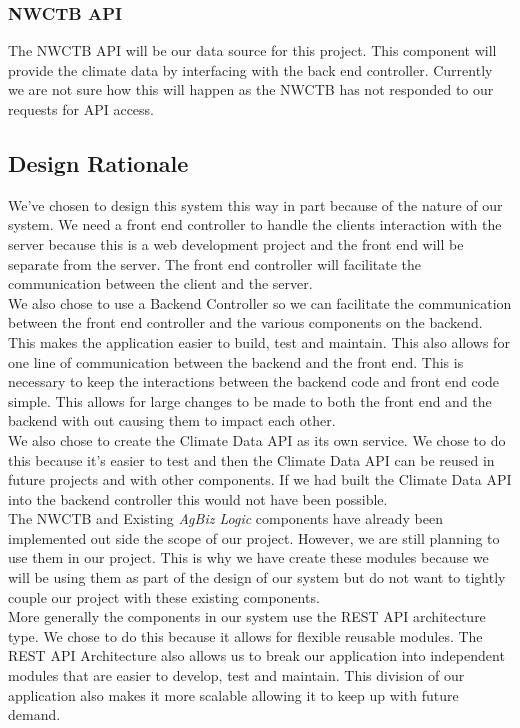 \documentclass[onecolumn, draftclsnofoot,10pt, compsoc]{article}
\begin{document}
		\subsubsection{NWCTB API}
			The NWCTB API will be our data source for this project. This component will provide the climate data by interfacing with the back end controller. Currently we are not sure how this will happen as the NWCTB has not responded to our requests for API access.\\
		
	\subsection{Design Rationale}
		We've chosen to design this system this way in part because of the nature of our system. We need a front end controller to handle the clients interaction with the server because this is a web development project and the front end will be separate from the server. The front end controller will facilitate the communication between the client and the server.\\
		We also chose to use a Backend Controller so we can facilitate the communication between the front end controller and the various components on the backend. This makes the application easier to build, test and maintain. This also allows for one line of communication between the backend and the front end. This is necessary to keep the interactions between the backend code and front end code simple. This allows for large changes to be made to both the front end and the backend with out causing them to impact each other.\\
		We also chose to create the Climate Data API as its own service. We chose to do this because it's easier to test and then the Climate Data API can be reused in future projects and with other components. If we had built the Climate Data API into the backend controller this would not have been possible.\\
		The NWCTB and Existing \textit{AgBiz Logic} components have already been implemented out side the scope of our project. However, we are still planning to use them in our project. This is why we have create these modules because we will be using them as part of the design of our system but do not want to tightly couple our project with these existing components.\\
		More generally the components in our system use the REST API architecture type. We chose to do this because it allows for flexible reusable modules. The REST API Architecture also allows us to break our application into independent modules that are easier to develop, test and maintain. This division of our application also makes it more scalable allowing it to keep up with future demand.\\
		
\end{document}
